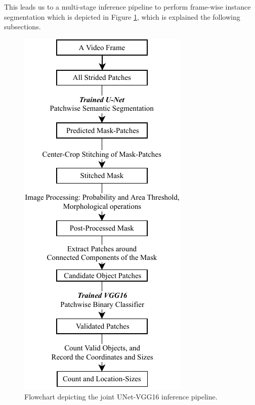 \documentclass[10pt,twocolumn,letterpaper]{article}
\begin{document}
This leads us to a multi-stage inference pipeline to perform frame-wise instance segmentation which is depicted in Figure \ref{fig:flowchart}, which is explained the following subsections.

\begin{figure}[t]
\begin{center}
   \includegraphics[width=0.8\linewidth]{flowchart.pdf}
\end{center}
   \caption{Flowchart depicting the joint UNet-VGG16 inference pipeline.}
\label{fig:long}
\label{fig:flowchart}
\end{figure}
\end{document}
